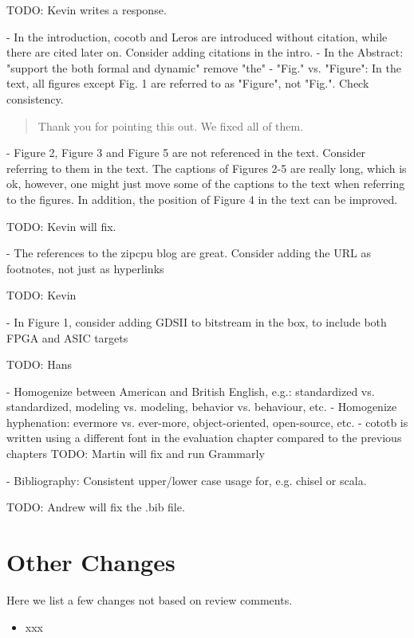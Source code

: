 \documentclass{article}
\newcommand{\todo}[1]{{\color{olive} TODO: #1}}
\newcommand{\reply}[1]{{\color{blue} #1}}
\begin{document}
\todo{Kevin writes a response.}

- In the introduction, cocotb and Leros are introduced without citation, while there are cited later on. Consider adding citations in the intro.
- In the Abstract: "support the both formal and dynamic" remove "the"
- "Fig." vs. "Figure": In the text, all figures except Fig. 1 are referred to as "Figure", not "Fig.". Check consistency.

\begin{quote}
\reply{Thank you for pointing this out. We fixed all of them.}
\end{quote}

- Figure 2, Figure 3 and Figure 5 are not referenced in the text. Consider referring to them in the text. The captions of Figures 2-5 are really long, which is ok, however, one might just move some of the captions to the text when referring to the figures. In addition, the position of Figure 4 in the text can be improved. 

\todo{Kevin will fix.}

- The references to the zipcpu blog are great. Consider adding the URL as footnotes, not just as hyperlinks

\todo{Kevin}

- In Figure 1, consider adding GDSII to bitstream in the box, to include both FPGA and ASIC targets

\todo{Hans}

- Homogenize between American and British English, e.g.: standardized vs. standardized, modeling vs. modeling, behavior vs. behaviour, etc.
- Homogenize hyphenation: evermore vs. ever-more, object-oriented, open-source, etc.
- cototb is written using a different font in the evaluation chapter compared to the previous chapters
\todo{Martin will fix and run Grammarly}

- Bibliography: Consistent upper/lower case usage for, e.g. chisel or scala.

\todo{Andrew will fix the .bib file.}




\section*{Other Changes}

Here we list a few changes not based on review comments.

\begin{itemize}
	\item xxx
\end{itemize}
\end{document}
